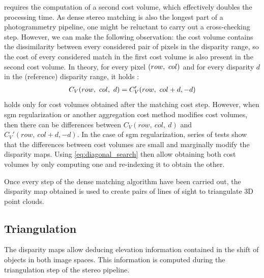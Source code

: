 \begin{remark}
      requires the computation of a second cost volume, which effectively doubles the processing time. As dense stereo matching is also the longest part of a photogrammetry pipeline, one might be reluctant to carry out a cross-checking step. However, we can make the following observation: the cost volume contains the dissimilarity between every considered pair of pixels in the disparity range, so the cost of every considered match in the first cost volume is also present in the second cost volume. In theory, for every pixel $(row, ~col)$ and for every disparity $d$ in the (reference) disparity range, it holds \cite{bebis_mutual_2008}:
     \begin{align}\label{eq:diagonal_search}
         C_V(row, ~col,~d) = C_V'(row, ~col+d, -d)
     \end{align}
      holds only for cost volumes obtained after the matching cost step. However, when \acrshort{sgm} regularization or another aggregation cost method modifies cost volumes, then there can be differences between $C_V(row,~col,~d)$ and $C_V'(row,~col+d, -d)$. In the case of \acrshort{sgm} regularization, series of tests show that the differences between cost volumes are small and marginally modify the disparity maps. Using \eqref{eq:diagonal_search} then allow obtaining both cost volumes by only computing one and re-indexing it to obtain the other.
\end{remark}

Once every step of the dense matching algorithm have been carried out, the disparity map obtained is used to create pairs of lines of sight to triangulate 3D point clouds.

\subsection{Triangulation}\label{sec:triangulation}
The disparity maps allow deducing elevation information contained in the shift of objects in both image spaces. This information is computed during the triangulation step of the stereo pipeline.

